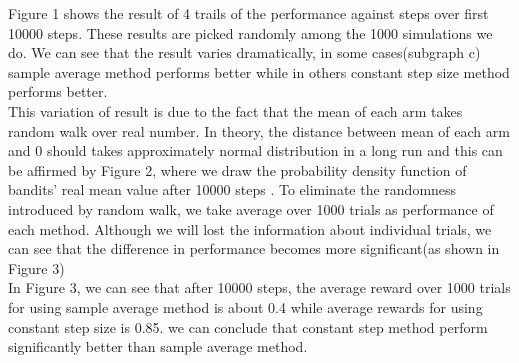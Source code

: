 \documentclass[12pt]{article}
\begin{document}
Figure 1 shows the result of 4 trails of the performance against steps over first 10000 steps. These results are picked randomly among the 1000 simulations we do. We can see that the result varies dramatically, in some cases(subgraph c) sample average method performs better while in others constant step size method performs better.\\

This variation of result is due to the fact that the mean of each arm takes random walk over real number. In theory, the distance between mean of each arm and 0 should takes approximately normal distribution in a long run and this can be affirmed by Figure 2, where we draw the probability density function of bandits’ real mean value after 10000 steps . To eliminate the randomness introduced by random walk, we take average over 1000 trials as performance of each method. Although we will lost the information about individual trials, we can see that the difference in performance becomes more significant(as shown in Figure 3)
\\

In Figure 3, we can see that after 10000 steps, the average reward over 1000 trials for using sample average method is about 0.4 while average rewards for using constant step size is 0.85. we can conclude that constant step method perform significantly better than sample average method. 
\end{document}
